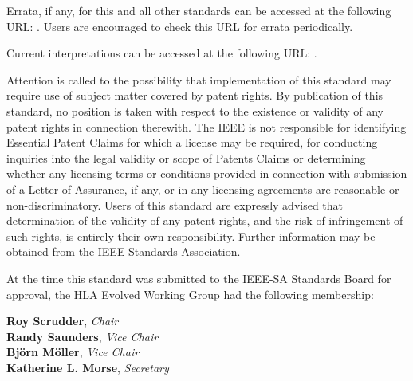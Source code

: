 \setcounter{page}{5}
\thispagestyle{front}
\begingroup
\fontsize{8.7}{10.25}\selectfont
\setlength{\parskip}{7.0pt plus .4pt minus .4pt}

Errata, if any, for this and all other standards can be accessed at the following URL: . Users are encouraged to check this URL for errata periodically.

Current interpretations can be accessed at the following URL: .

Attention is called to the possibility that implementation of this standard may require use of subject matter covered by patent rights. By publication of this standard, no position is taken with respect to the existence or validity of any patent rights in connection therewith. The IEEE is not responsible for identifying Essential Patent Claims for which a license may be required, for conducting inquiries into the legal validity or scope of Patents Claims or determining whether any licensing terms or conditions provided in connection with submission of a Letter of Assurance, if any, or in any licensing agreements are reasonable or non-discriminatory. Users of this standard are expressly advised that determination of the validity of any patent rights, and the risk of infringement of such rights, is entirely their own responsibility. Further information may be obtained from the IEEE Standards Association.

At the time this standard was submitted to the IEEE-SA Standards Board for approval, the HLA Evolved Working Group had the following membership:

\begin{center}
    {\bfseries Roy Scrudder}, \textit{Chair}\\
{\bfseries Randy Saunders}, \textit{Vice Chair}\\
{\bfseries Björn Möller}, \textit{Vice Chair}\\
{\bfseries Katherine L. Morse}, \textit{Secretary}
\end{center}
\vspace{-5pt}

